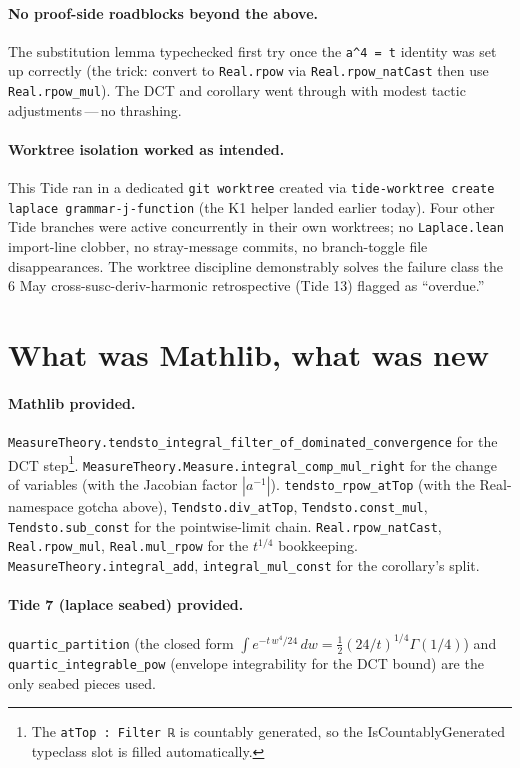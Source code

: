 \documentclass[11pt]{article}
\begin{document}
\paragraph{No proof-side roadblocks beyond the above.} The
substitution lemma typechecked first try once the \texttt{a^4 = t}
identity was set up correctly (the trick: convert to
\texttt{Real.rpow} via \texttt{Real.rpow\_natCast} then use
\texttt{Real.rpow\_mul}). The DCT and corollary went through with
modest tactic adjustments\,---\,no thrashing.

\paragraph{Worktree isolation worked as intended.} This Tide ran in
a dedicated \texttt{git worktree} created via
\texttt{tide-worktree create laplace grammar-j-function} (the K1
helper landed earlier today). Four other Tide branches
were active concurrently in their own worktrees; no
\texttt{Laplace.lean} import-line clobber, no stray-message commits,
no branch-toggle file disappearances. The worktree discipline
demonstrably solves the failure class the 6 May
cross-susc-deriv-harmonic retrospective (Tide 13) flagged as
``overdue.''

\section{What was Mathlib, what was new}

\paragraph{Mathlib provided.}
\texttt{MeasureTheory.tendsto\_integral\_filter\_of\_dominated\_convergence}
for the DCT step\footnote{The \texttt{atTop : Filter ℝ} is countably
generated, so the IsCountablyGenerated typeclass slot is filled
automatically.}.
\texttt{MeasureTheory.Measure.integral\_comp\_mul\_right} for the
change of variables (with the Jacobian factor $|a^{-1}|$).
\texttt{tendsto\_rpow\_atTop} (with the Real-namespace gotcha
above), \texttt{Tendsto.div\_atTop}, \texttt{Tendsto.const\_mul},
\texttt{Tendsto.sub\_const} for the pointwise-limit chain.
\texttt{Real.rpow\_natCast}, \texttt{Real.rpow\_mul},
\texttt{Real.mul\_rpow} for the
$t^{1/4}$ bookkeeping. \texttt{MeasureTheory.integral\_add},
\texttt{integral\_mul\_const} for the corollary's split.

\paragraph{Tide 7 (laplace seabed) provided.}
\texttt{quartic\_partition} (the closed form
$\int e^{-t\,w^4/24}\,dw = \tfrac12 (24/t)^{1/4} \Gamma(1/4)$) and
\texttt{quartic\_integrable\_pow} (envelope integrability for the
DCT bound) are the only seabed pieces used.
\end{document}
